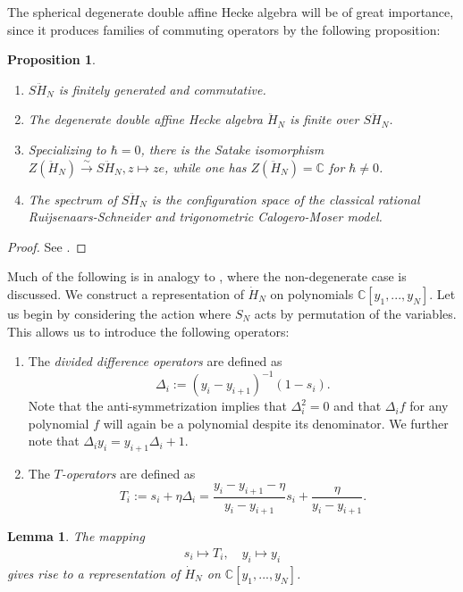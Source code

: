 \documentclass[11pt]{report}
\newtheorem{lemma}[theorem]{Lemma}
\newtheorem{prop}[theorem]{Proposition}
\theoremstyle{definition}
\theoremstyle{remark}
\theoremstyle{remark}
\newcommand{\C}{\mathbb{C}}
\begin{document}
The spherical degenerate double affine Hecke algebra will be of great importance, since it produces families of commuting operators by the following proposition: 

\begin{prop}
\begin{enumerate}[label=(\roman*)]
\item $S\ddot H_N$ is finitely generated and commutative.
\item The degenerate double affine Hecke algebra $\ddot H_N$ is finite over $S\ddot H_N$.
\item Specializing to $\hbar = 0$, there is the Satake isomorphism $Z(\ddot H_N) \overset \sim \to S\ddot H_N, z \mapsto ze$, while one has $Z(\ddot H_N) = \C$ for $\hbar \neq 0$.
\item The spectrum of $S\ddot H_N$ is the configuration space of the classical rational Ruijsenaars-Schneider and trigonometric Calogero-Moser model.
\end{enumerate}
\end{prop}

\begin{proof}
See \cite{article:oblomkov:2003}.
\end{proof}

Much of the following is in analogy to \cite{article:lamers:2022}, where the non-degenerate case is discussed. We construct a representation of $\dot H_N$ on polynomials $\C[y_1,...,y_N]$. Let us begin by considering the action where $S_N$ acts by permutation of the variables. This allows us to introduce the following operators:
\begin{enumerate}[label=(\roman*)]
\item The \emph{divided difference operators} are defined as
\begin{equation*}
\Delta_i := (y_i-y_{i+1})^{-1} (1-s_i).
\end{equation*}
Note that the anti-symmetrization implies that $\Delta_i^2 = 0$ and that $\Delta_i f$ for any polynomial $f$ will again be a polynomial despite its denominator. We further note that $\Delta_i y_i = y_{i+1} \Delta_i + 1$.
\item The \emph{$T$-operators} are defined as
\begin{equation*}
T_i := s_i + \eta \Delta_i = \frac{y_i-y_{i+1}-\eta}{y_i-y_{i+1}} s_i + \frac{\eta}{y_i-y_{i+1}}.
\end{equation*}
\end{enumerate}

\begin{lemma}
The mapping
\begin{align*}
s_i \mapsto T_i, \quad y_i \mapsto y_i
\end{align*}
gives rise to a representation of $\dot H_N$ on $\C[y_1,...,y_N]$.
\end{lemma}
\end{document}
